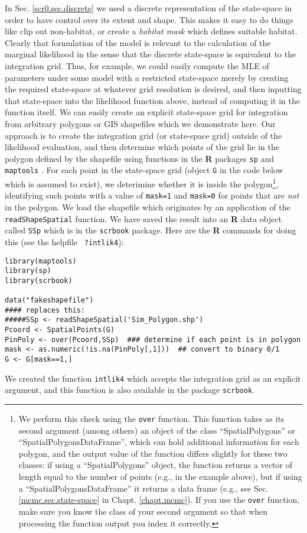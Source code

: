 In Sec. \ref{scr0.sec.discrete} we used a discrete representation of
the state-space in order to have control over its extent and
shape. This makes it easy to do things like clip out non-habitat, or
create a {\it habitat mask} which defines suitable habitat.  Clearly
that formulation of the model is relevant to the calculation of the
marginal likelihood in the sense that the discrete state-space is
equivalent to the integration grid.  Thus, for example, we could
easily compute the MLE of parameters under some model with a
restricted state-space merely by creating the required state-space at
whatever grid resolution is desired, and then inputting that
state-space into the likelihood function above, instead of computing
it in the function itself. We can easily create an explicit
state-space grid for integration from arbitrary polygons or GIS
shapefiles  which we demonstrate here. Our approach
is to create the integration grid (or state-space grid) outside of the
likelihood evaluation, and then determine which points of the grid lie
in the polygon defined by the shapefile using functions in the {\bf R}
packages \mbox{\tt sp}  and \mbox{\tt maptools}
 .  For each point in the
state-space grid (object \mbox{\tt G} in the code below which is
assumed to exist), we deterimine whether it is inside the
polygon\footnote{We perform this check using the {\tt over}
  function. This function takes as its second argument (among others)
  an object of the class ``SpatialPolygons'' or
  ``SpatialPolygonsDataFrame'', which can hold additional information
  for each polygon, and the output value of the function differs
  slightly for these two classes: if using a ``SpatialPolygons''
  object, the function returns a vector of length equal to the number
  of points (e.g., in the example above), but if using a
  ``SpatialPolygonsDataFrame'' it returns a data frame
  (e.g., see Sec. \ref{mcmc.sec.state-space} in
  Chapt. \ref{chapt.mcmc}). If you use the {\tt over} function, make
  sure you know the class of your second argument so that when
  processing the function output you index it correctly.}, identifying
such points with a value of \mbox{\tt mask=1} and \mbox{\tt mask=0}
for points that are {\it not} in the polygon.  We load the shapefile
which originates by an application of the \mbox{\tt readShapeSpatial}
function. We have saved the result into an {\bf R} data object called
\mbox{\tt SSp} which is in the \mbox{\tt scrbook} package.  Here are
the {\bf R} commands for doing this (see the helpfile \mbox{\tt
  ?intlik4}): {\small
\begin{verbatim}
library(maptools)
library(sp)
library(scrbook)

data("fakeshapefile")
#### replaces this:
#####SSp <- readShapeSpatial('Sim_Polygon.shp')
Pcoord <- SpatialPoints(G)
PinPoly <- over(Pcoord,SSp)  ### determine if each point is in polygon
mask <- as.numeric(!is.na(PinPoly[,1]))  ## convert to binary 0/1
G <- G[mask==1,]
\end{verbatim}
}
We created  the function \mbox{\tt intlik4} which accepts the integration
grid as an explicit argument, and this function is also available in
the package  \mbox{\tt scrbook}.

